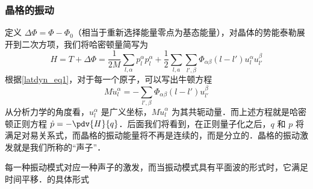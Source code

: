 \subsubsection{晶格的振动}
定义 $\Delta \Phi=\Phi-\Phi_0$（相当于重新选择能量零点为基态能量），对晶体的势能泰勒展开到二次方项，我们将哈密顿量简写为
\begin{equation}
H=T+\Delta \Phi=\frac{1}{2M}\sum_{l,\alpha}p_l^\alpha p_l^\alpha + \frac{1}{2}\sum_{l,a}\sum_{l',\beta}\Phi_{\alpha\beta}(l-l')u_l^\alpha u_{l'}^\beta
\end{equation}
根据\autoref{latdyn_eq1}，对于每一个原子，可以写出牛顿方程
\begin{equation}
M \ddot{u}_l^\alpha = -\sum_{l',\beta}\Phi_{\alpha\beta}(l-l')u_{l'}^\beta
\end{equation}
从分析力学的角度看，$u_l^\alpha$ 是广义坐标，$M\dot{u}_l^\alpha$ 为其共轭动量．而上述方程就是哈密顿正则方程 $\dot{p}=-\pdv{H}{q}$．后面我们将看到，在正则量子化之后，$q$ 和 $p$ 将满足对易关系式，而晶格的振动能量将不再是连续的，而是分立的．晶格的振动激发就是我们所称的“声子”．

每一种振动模式对应一种声子的激发，而当振动模式具有平面波的形式时，它满足时间平移．的具体形式
